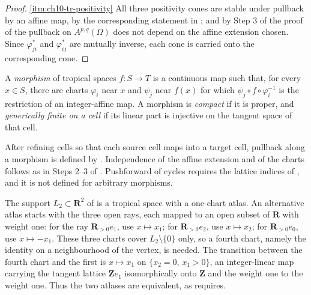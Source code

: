 \begin{proof}
\cref{itm:ch10-tr-positivity}
All three positivity cones are stable under pullback by an affine map, by the
corresponding statement in ; and by Step 3 of the proof
of  the pullback on
$A^{p,q}(\Omega)$ does not depend on the affine extension chosen.  Since
$\varphi_{ji}^*$ and $\varphi_{ij}^*$ are mutually inverse, each cone is
carried onto the corresponding cone.
\end{proof}

\begin{definition}
\label{def:ch10-tropical-morphism}
A \emph{morphism} of tropical spaces $f:S\to T$ is a continuous map such
that, for every $x\in S$, there are charts $\varphi_i$ near $x$ and $\psi_j$
near $f(x)$ for which $\psi_j\circ f\circ\varphi_i^{-1}$ is the restriction
of an integer-affine map.  A morphism is \emph{compact} if it is proper, and
\emph{generically finite on a cell} if its linear part is
injective on the tangent space of that cell.
\end{definition}

After refining cells so that each source cell maps into a target cell,
pullback along a morphism is defined by
. Independence of the affine
extension and of the charts follows as in Steps 2--3 of
.
Pushforward of cycles requires the lattice indices of
, and it is not defined for arbitrary morphisms.

\begin{example}
\label{ex:ch10-line-as-space}
The support $L_2\subset\mathbf R^2$ of  is a
tropical space with a one-chart atlas. An alternative atlas starts with
the three open rays, each mapped to an open subset of $\mathbf R$
with weight one: for the ray $\mathbf R_{>0}e_1$, use $x\mapsto x_1$; for
$\mathbf R_{>0}e_2$, use $x\mapsto x_2$; for $\mathbf R_{>0}e_0$, use
$x\mapsto-x_1$.  These three charts cover $L_2\setminus\{0\}$ only, so a
fourth chart, namely the identity on a neighbourhood of the vertex, is
needed.  The transition between the fourth chart and the first is
$x\mapsto x_1$ on $\{x_2=0,\,x_1>0\}$, an integer-linear map carrying the
tangent lattice $\mathbf Z e_1$ isomorphically onto $\mathbf Z$ and the
weight one to the weight one.  Thus the two atlases are equivalent, as
 requires.
\end{example}

